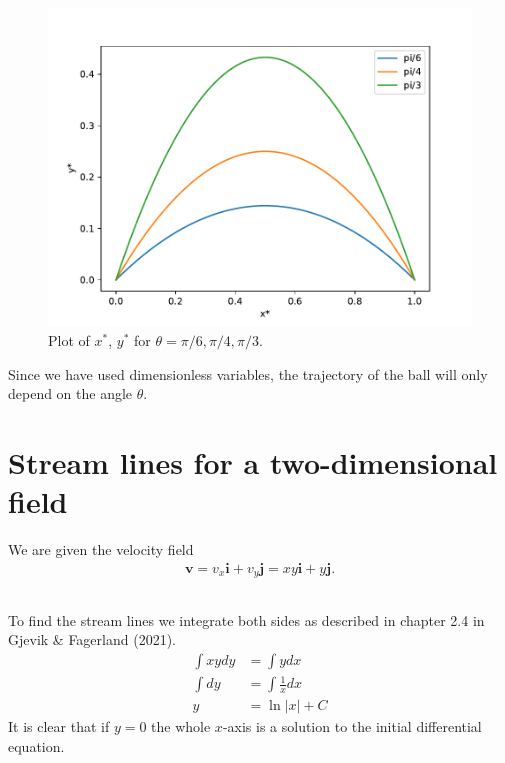\documentclass[a4paper,10pt,english]{article}
\begin{document}
\subsection{}


\newpage
\begin{figure}[h!]
    \centering
    \includegraphics[scale=0.8]{figures/figure_1_c.pdf}
    \caption{Plot of $x^*$, $y^*$ for $\theta = \pi/6, \pi/4, \pi/3$.}
    \label{fig:figure_1_c}
\end{figure}
Since we have used dimensionless variables, the trajectory of the ball will only depend on the angle $\theta$. 

\section{Stream lines for a two-dimensional field}
We are given the velocity field
\begin{align}
    \bm{v} = v_x \bm{i} + v_y \bm{j} = xy \bm{i} + y \bm{j}.
    \label{eq:3}
\end{align}
\subsection{}
To find the stream lines we integrate both sides as described in chapter 2.4 in Gjevik \& Fagerland (2021).
\begin{align*}
    \int xy dy &= \int y dx \\
    \int dy &= \int\frac{1}{x} dx \\
    y &= \ln{|x|} + C
\end{align*}
It is clear that if $y=0$ the whole $x$-axis is a solution to the initial differential equation.
\end{document}
